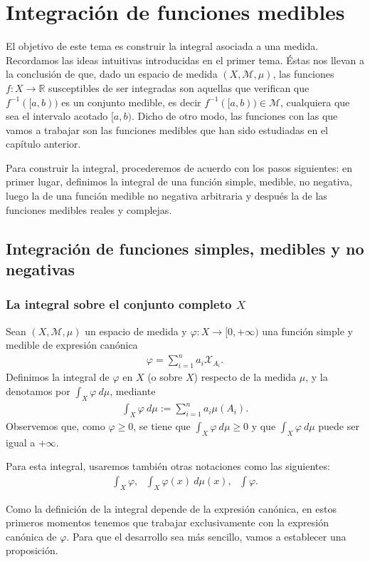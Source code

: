 \chapter{Integración de funciones medibles}

El objetivo de este tema es construir la integral asociada a una medida. Recordamos las ideas intuitivas introducidas en el primer tema. Éstas nos llevan a la conclusión de que, dado un espacio de medida $(X, \mathcal{M}, \mu)$, las funciones $f: X \longrightarrow \mathbb{R}$ susceptibles de ser integradas son aquellas que verifican que $f^{-1}([a, b))$ es un conjunto medible, es decir $f^{-1}([a, b)) \in \mathcal{M}$, cualquiera que sea el intervalo acotado $[a, b)$. Dicho de otro modo, las funciones con las que vamos a trabajar son las funciones medibles que han sido estudiadas en el capítulo anterior.

Para construir la integral, procederemos de acuerdo con los pasos siguientes: en primer lugar, definimos la integral de una función simple, medible, no negativa, luego la de una función medible no negativa arbitraria y después la de las funciones medibles reales y complejas.

\section{Integración de funciones simples, medibles y no negativas}

\subsection{La integral sobre el conjunto completo $X$}

\begin{defi}
    Sean $(X, \mathcal{M}, \mu)$ un espacio de medida y $\varphi: X \longrightarrow [0, +\infty)$ una función simple y medible de expresión canónica
    \begin{align*}
        \varphi = \sum_{i=1}^{n}{a_i \mathcal{X}_{A_i}}.
    \end{align*}
    Definimos la integral de $\varphi$ en $X$ (o sobre $X$) respecto de la medida $\mu$, y la denotamos por $\int_{X}{\varphi} \ d\mu$, mediante
    \begin{align*}
        \int_{X}{\varphi \ d\mu} := \sum_{i=1}^{n}{a_i\mu(A_i)}.
    \end{align*}
    Observemos que, como $\varphi \ge 0$, se tiene que $\int_{X}{\varphi} \ d\mu \ge 0$ y que $\int_{X}{\varphi} \ d\mu$ puede ser igual a $+\infty$.

    Para esta integral, usaremos también otras notaciones como las siguientes:
    \begin{align*}
        \int_{X}{\varphi}, \ \ \ \int_{X}{\varphi(x) \ d\mu(x)}, \ \ \ \int{\varphi}.
    \end{align*}
\end{defi}
Como la definición de la integral depende de la expresión canónica, en estos primeros momentos tenemos que trabajar exclusivamente con la expresión canónica de $\varphi$. Para que el desarrollo sea más sencillo, vamos a establecer una proposición.

